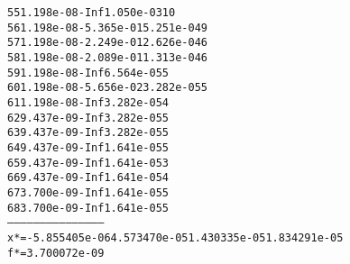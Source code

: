 \begin{alltt}
  55   1.198e-08        -Inf   1.050e-03   10
  56   1.198e-08  -5.365e-01   5.251e-04    9
  57   1.198e-08  -2.249e-01   2.626e-04    6
  58   1.198e-08  -2.089e-01   1.313e-04    6
  59   1.198e-08        -Inf   6.564e-05    5
  60   1.198e-08  -5.656e-02   3.282e-05    5
  61   1.198e-08        -Inf   3.282e-05    4
  62   9.437e-09        -Inf   3.282e-05    5
  63   9.437e-09        -Inf   3.282e-05    5
  64   9.437e-09        -Inf   1.641e-05    5
  65   9.437e-09        -Inf   1.641e-05    3
  66   9.437e-09        -Inf   1.641e-05    4
  67   3.700e-09        -Inf   1.641e-05    5
  68   3.700e-09        -Inf   1.641e-05    5
---------------------------------------------
x* = -5.855405e-06  4.573470e-05  1.430335e-05  1.834291e-05  
f* = 3.700072e-09
\end{alltt}
